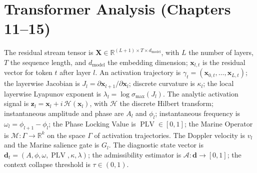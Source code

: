 \documentclass[11pt,twoside,openright]{book}
\numberwithin{equation}{chapter}
\theoremstyle{definition}
\theoremstyle{plain}
\theoremstyle{remark}
\theoremstyle{definition}
\begin{document}
\section{Transformer Analysis (Chapters 11--15)}

The residual stream tensor is
$\mathbf{X}\in\mathbb{R}^{(L+1)\times T\times d_{\mathrm{model}}}$, with
$L$ the number of layers, $T$ the sequence length, and
$d_{\mathrm{model}}$ the embedding dimension; $\mathbf{x}_{l,t}$ is the
residual vector for token $t$ after layer $l$. An activation trajectory
is $\gamma_t=(\mathbf{x}_{0,t},\ldots,\mathbf{x}_{L,t})$; the layerwise
Jacobian is $J_l=\partial\mathbf{x}_{l+1}/\partial\mathbf{x}_l$; discrete
curvature is $\kappa_l$; the local layerwise Lyapunov exponent is
$\lambda_l=\log\sigma_{\max}(J_l)$. The analytic activation signal is
$\mathbf{z}_l=\mathbf{x}_l+i\,\mathcal{H}(\mathbf{x}_l)$, with
$\mathcal{H}$ the discrete Hilbert transform; instantaneous amplitude and
phase are $A_l$ and $\phi_l$; instantaneous frequency is
$\omega_l=\phi_{l+1}-\phi_l$; the Phase Locking Value is
$\operatorname{PLV}\in[0,1]$; the Marine Operator is
$\mathcal{M}:\Gamma\to\mathbb{R}^k$ on the space $\Gamma$ of activation
trajectories. The Doppler velocity is $v_l$ and the Marine salience
gate is $G_l$. The diagnostic state vector is
$\mathbf{d}_t=(A,\phi,\omega,\operatorname{PLV},\kappa,\lambda)$; the
admissibility estimator is $\mathcal{A}:\mathbf{d}\to[0,1]$; the context
collapse threshold is $\tau\in(0,1)$.
\end{document}
